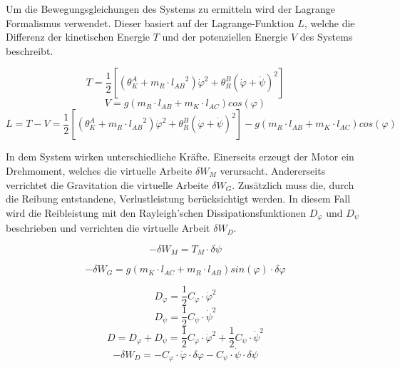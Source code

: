 \newpage
Um die Bewegungsgleichungen des Systems zu ermitteln wird der Lagrange Formalismus verwendet. Dieser basiert auf der Lagrange-Funktion $L$, welche die Differenz der kinetischen Energie $T$ und der potenziellen Energie $V$ des Systems beschreibt.

\begin{equation}
T = \frac{1}{2}[({\theta}^A_K + m_R \cdot {l_{AB}}^2) {\dot{\varphi}}^2 + {\theta}^B_R(\dot{\varphi}+\dot{\psi})^2]
\end{equation}
\begin{equation}
V = g(m_R \cdot l_{AB} + m_K \cdot l_{AC})cos(\varphi)
\end{equation}
\begin{equation}
L = T - V = \frac{1}{2}[({\theta}^A_K + m_R \cdot {l_{AB}}^2) {\dot{\varphi}}^2 + {\theta}^B_R(\dot{\varphi}+\dot{\psi})^2] - g(m_R \cdot l_{AB} + m_K \cdot l_{AC})cos(\varphi)
\end{equation}

In dem System wirken unterschiedliche Kräfte. Einerseits erzeugt der Motor ein Drehmoment, welches die virtuelle Arbeite $\delta W_M$ verursacht. Andererseits verrichtet die Gravitation die virtuelle Arbeite $\delta W_G$. Zusätzlich muss die, durch die Reibung entstandene, Verlustleistung berücksichtigt werden. In diesem Fall wird die Reibleistung mit den Rayleigh'schen Dissipationsfunktionen $D_{\varphi}$ und $D_{\psi}$ beschrieben und verrichten die virtuelle Arbeit $\delta W_D$.

\begin{equation}
-\delta W_M = T_M \cdot \delta \psi
\end{equation}

\begin{equation}
-\delta W_G = g(m_K \cdot l_{AC} + m_R \cdot l_{AB})sin(\varphi) \cdot \delta \varphi
\end{equation}

\begin{equation}
D_{\varphi} = \frac{1}{2}C_{\varphi} \cdot {\dot{\varphi}}^2
\end{equation}
\begin{equation}
D_{\psi} = \frac{1}{2}C_{\psi} \cdot {\dot{\psi}}^2
\end{equation}
\begin{equation}
D = D_{\varphi} + D_{\psi} = \frac{1}{2}C_{\varphi} \cdot {\dot{\varphi}}^2 + \frac{1}{2}C_{\psi} \cdot {\dot{\psi}}^2
\end{equation}
\begin{equation}
-\delta W_D = - C_{\varphi} \cdot \dot{\varphi} \cdot \delta \varphi - C_{\psi} \cdot \dot{\psi} \cdot \delta \psi
\end{equation}

